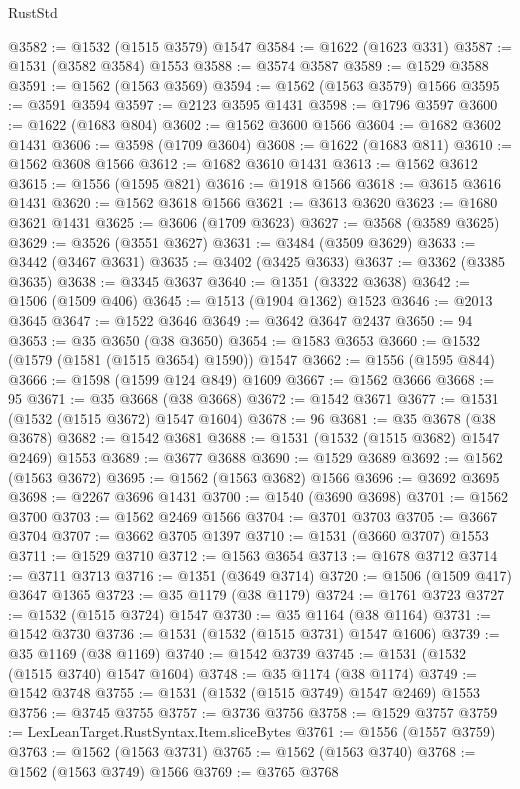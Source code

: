 \begin{lexlean}{RustStd}
\begin{coremodule}
@3582 := @1532 (@1515 @3579) @1547
@3584 := @1622 (@1623 @331)
@3587 := @1531 (@3582 @3584) @1553
@3588 := @3574 @3587
@3589 := @1529 @3588
@3591 := @1562 (@1563 @3569)
@3594 := @1562 (@1563 @3579) @1566
@3595 := @3591 @3594
@3597 := @2123 @3595 @1431
@3598 := @1796 @3597
@3600 := @1622 (@1683 @804)
@3602 := @1562 @3600 @1566
@3604 := @1682 @3602 @1431
@3606 := @3598 (@1709 @3604)
@3608 := @1622 (@1683 @811)
@3610 := @1562 @3608 @1566
@3612 := @1682 @3610 @1431
@3613 := @1562 @3612
@3615 := @1556 (@1595 @821)
@3616 := @1918 @1566
@3618 := @3615 @3616 @1431
@3620 := @1562 @3618 @1566
@3621 := @3613 @3620
@3623 := @1680 @3621 @1431
@3625 := @3606 (@1709 @3623)
@3627 := @3568 (@3589 @3625)
@3629 := @3526 (@3551 @3627)
@3631 := @3484 (@3509 @3629)
@3633 := @3442 (@3467 @3631)
@3635 := @3402 (@3425 @3633)
@3637 := @3362 (@3385 @3635)
@3638 := @3345 @3637
@3640 := @1351 (@3322 @3638)
@3642 := @1506 (@1509 @406)
@3645 := @1513 (@1904 @1362) @1523
@3646 := @2013 @3645
@3647 := @1522 @3646
@3649 := @3642 @3647 @2437
@3650 := 94
@3653 := @35 @3650 (@38 @3650)
@3654 := @1583 @3653
@3660 := @1532 (@1579 (@1581 (@1515 @3654) @1590)) @1547
@3662 := @1556 (@1595 @844)
@3666 := @1598 (@1599 @124 @849) @1609
@3667 := @1562 @3666
@3668 := 95
@3671 := @35 @3668 (@38 @3668)
@3672 := @1542 @3671
@3677 := @1531 (@1532 (@1515 @3672) @1547 @1604)
@3678 := 96
@3681 := @35 @3678 (@38 @3678)
@3682 := @1542 @3681
@3688 := @1531 (@1532 (@1515 @3682) @1547 @2469) @1553
@3689 := @3677 @3688
@3690 := @1529 @3689
@3692 := @1562 (@1563 @3672)
@3695 := @1562 (@1563 @3682) @1566
@3696 := @3692 @3695
@3698 := @2267 @3696 @1431
@3700 := @1540 (@3690 @3698)
@3701 := @1562 @3700
@3703 := @1562 @2469 @1566
@3704 := @3701 @3703
@3705 := @3667 @3704
@3707 := @3662 @3705 @1397
@3710 := @1531 (@3660 @3707) @1553
@3711 := @1529 @3710
@3712 := @1563 @3654
@3713 := @1678 @3712
@3714 := @3711 @3713
@3716 := @1351 (@3649 @3714)
@3720 := @1506 (@1509 @417) @3647 @1365
@3723 := @35 @1179 (@38 @1179)
@3724 := @1761 @3723
@3727 := @1532 (@1515 @3724) @1547
@3730 := @35 @1164 (@38 @1164)
@3731 := @1542 @3730
@3736 := @1531 (@1532 (@1515 @3731) @1547 @1606)
@3739 := @35 @1169 (@38 @1169)
@3740 := @1542 @3739
@3745 := @1531 (@1532 (@1515 @3740) @1547 @1604)
@3748 := @35 @1174 (@38 @1174)
@3749 := @1542 @3748
@3755 := @1531 (@1532 (@1515 @3749) @1547 @2469) @1553
@3756 := @3745 @3755
@3757 := @3736 @3756
@3758 := @1529 @3757
@3759 := LexLeanTarget.RustSyntax.Item.sliceBytes
@3761 := @1556 (@1557 @3759)
@3763 := @1562 (@1563 @3731)
@3765 := @1562 (@1563 @3740)
@3768 := @1562 (@1563 @3749) @1566
@3769 := @3765 @3768

\end{coremodule}
\end{lexlean}
